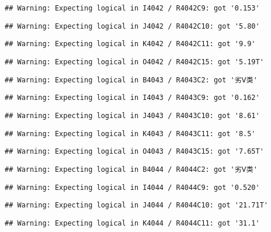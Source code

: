 \documentclass[
]{article}
\begin{document}
\begin{verbatim}
## Warning: Expecting logical in I4042 / R4042C9: got '0.153'
\end{verbatim}

\begin{verbatim}
## Warning: Expecting logical in J4042 / R4042C10: got '5.80'
\end{verbatim}

\begin{verbatim}
## Warning: Expecting logical in K4042 / R4042C11: got '9.9'
\end{verbatim}

\begin{verbatim}
## Warning: Expecting logical in O4042 / R4042C15: got '5.19T'
\end{verbatim}

\begin{verbatim}
## Warning: Expecting logical in B4043 / R4043C2: got '劣Ⅴ类'
\end{verbatim}

\begin{verbatim}
## Warning: Expecting logical in I4043 / R4043C9: got '0.162'
\end{verbatim}

\begin{verbatim}
## Warning: Expecting logical in J4043 / R4043C10: got '8.61'
\end{verbatim}

\begin{verbatim}
## Warning: Expecting logical in K4043 / R4043C11: got '8.5'
\end{verbatim}

\begin{verbatim}
## Warning: Expecting logical in O4043 / R4043C15: got '7.65T'
\end{verbatim}

\begin{verbatim}
## Warning: Expecting logical in B4044 / R4044C2: got '劣Ⅴ类'
\end{verbatim}

\begin{verbatim}
## Warning: Expecting logical in I4044 / R4044C9: got '0.520'
\end{verbatim}

\begin{verbatim}
## Warning: Expecting logical in J4044 / R4044C10: got '21.71T'
\end{verbatim}

\begin{verbatim}
## Warning: Expecting logical in K4044 / R4044C11: got '31.1'
\end{verbatim}
\end{document}

